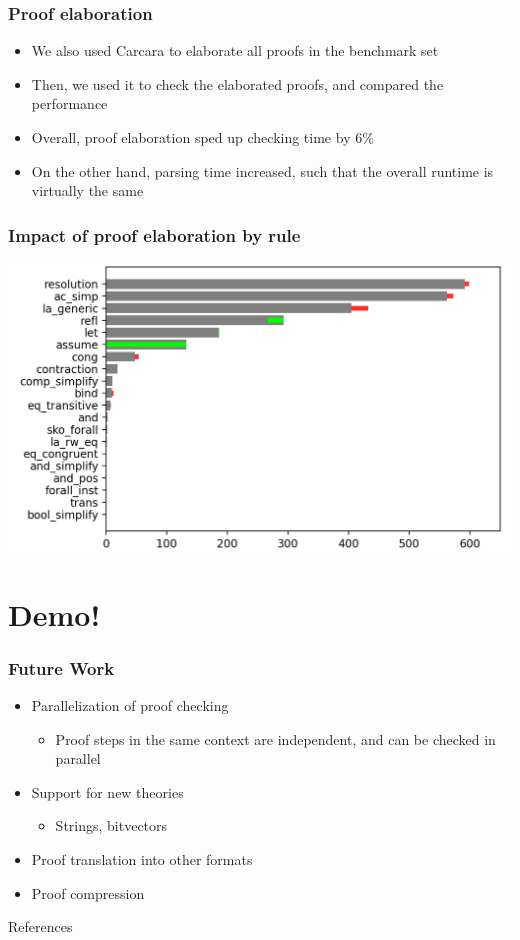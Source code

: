\documentclass[usepdftitle=false,aspectratio=169]{beamer}
\newcommand\vitem{\vfill\item}
\begin{document}
\begin{frame}
  \frametitle{Proof elaboration}
  \begin{itemize}
    \item We also used Carcara to elaborate all proofs in the benchmark set
    \vitem Then, we used it to check the elaborated proofs, and compared the
    performance
    \vitem Overall, proof elaboration sped up checking time by 6\%
    \vitem On the other hand, parsing time increased, such that the overall
    runtime is virtually the same
  \end{itemize}
\end{frame}

\begin{frame}
  \frametitle{Impact of proof elaboration by rule}
  \centering
  \includegraphics[height=0.85\textheight]{images/by-rules-comp.png}
\end{frame}

\section{Demo!}

\begin{frame}
  \frametitle{Future Work}
  \begin{itemize}
    \item Parallelization of proof checking
    \begin{itemize}
      \item Proof steps in the same context are independent, and can be checked
      in parallel
    \end{itemize}
    \vitem Support for new theories
    \begin{itemize}
      \item Strings, bitvectors
    \end{itemize}
    \vitem Proof translation into other formats
    \vitem Proof compression
  \end{itemize}
\end{frame}

\begin{frame}{References}
\printbibliography
\end{frame}
\end{document}

